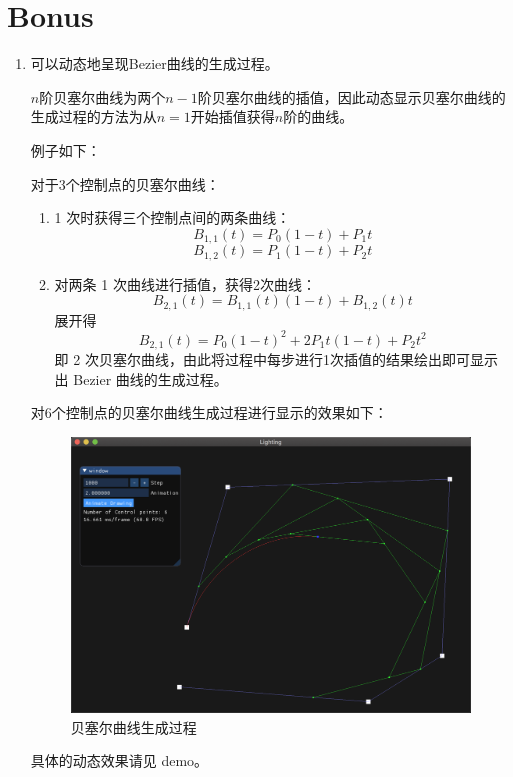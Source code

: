 \documentclass[12pt]{article}
\begin{document}
\section{Bonus}
\begin{enumerate}
    \item 可以动态地呈现Bezier曲线的生成过程。
    
    $n$阶贝塞尔曲线为两个$n-1$阶贝塞尔曲线的插值，因此动态显示贝塞尔曲线的生成过程的方法为从$n=1$开始插值获得$n$阶的曲线。

    例子如下：

    对于3个控制点的贝塞尔曲线：
    \begin{enumerate}
        \item 1 次时获得三个控制点间的两条曲线：
        $$B_{1,1}(t)=P_0(1-t)+P_1t$$
        $$B_{1,2}(t)=P_1(1-t)+P_2t$$

        \item 对两条 1 次曲线进行插值，获得2次曲线：
        $$B_{2,1}(t)=B_{1,1}(t)(1-t)+B_{1,2}(t)t$$
        展开得
        $$B_{2,1}(t)=P_0(1-t)^2+2P_1t(1-t)+P_2t^2$$
        即 2 次贝塞尔曲线，由此将过程中每步进行1次插值的结果绘出即可显示出 Bezier 曲线的生成过程。
        
    \end{enumerate}

    对6个控制点的贝塞尔曲线生成过程进行显示的效果如下：
    \begin{figure}[H]
        \centering
        \includegraphics[scale=0.5]{dyn.png}
        \caption{贝塞尔曲线生成过程}
        \label{}
    \end{figure}

    具体的动态效果请见 demo。
\end{enumerate}
        
\end{document}
